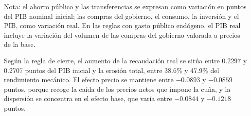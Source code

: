 \documentclass[11pt]{article}
\begin{document}
\begin{table}[H]
\centering
\caption{Incremento del IVA: destino de los recursos y ajuste del cierre según la regla}
\label{tab:cierre-iva-uso}
\small
{}
\par\smallskip
\begin{minipage}{\textwidth}
\footnotesize Nota: el ahorro público y las transferencias se expresan como variación en puntos del PIB nominal inicial; las compras del gobierno, el consumo, la inversión y el PIB, como variación real. En las reglas con gasto público endógeno, el PIB real incluye la variación del volumen de las compras del gobierno valorada a precios de la base.
\end{minipage}
\end{table}

Según la regla de cierre, el aumento de la recaudación real se sitúa entre 0.2297 y 0.2707 puntos del PIB inicial y la erosión total, entre 38.6\% y 47.9\% del rendimiento mecánico. El efecto precio se mantiene entre $-0.0893$ y $-0.0859$ puntos, porque recoge la caída de los precios netos que impone la cuña, y la dispersión se concentra en el efecto base, que varía entre $-0.0844$ y $-0.1218$ puntos.
\end{document}
